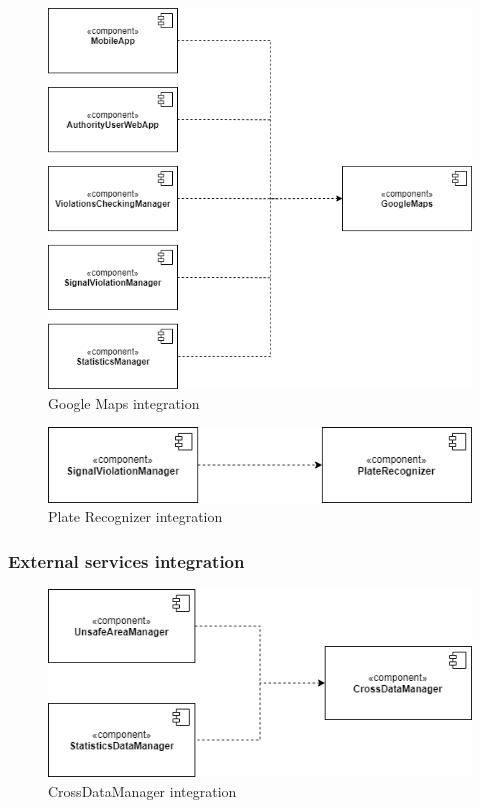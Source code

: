             \begin{figure}[H]
                \includegraphics[scale=0.7]{dd/resources/images/Integration-GoogleMaps.png}
                \caption{Google Maps integration}        
            \end{figure}
            \begin{figure}[H]
                \includegraphics[scale=0.7]{dd/resources/images/Integration-PlateRecognizer.png}
                \caption{Plate Recognizer integration}        
            \end{figure}

        \subsubsection{External services integration}    
            \begin{figure}[H]
                \includegraphics[scale=0.7]{dd/resources/images/Integration-CrossDataManager.png}
                \caption{CrossDataManager integration}        
            \end{figure}